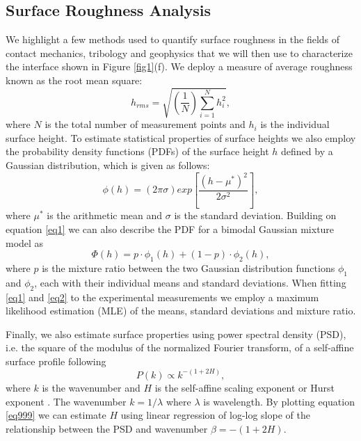 \documentclass[final,3p, 11pt,authoryear]{elsarticle}
\begin{document}
\subsection{Surface Roughness Analysis}
\label{SRA}
We highlight a few methods used to quantify surface roughness in the fields of contact mechanics, tribology and geophysics that we will then use to characterize the interface shown in Figure \ref{fig1}(f). We deploy a measure of average roughness known as the root mean square:
\begin{equation}
h_{rms} = \sqrt{\left(\frac{1}{N} \right) \sum^{N}_{i=1} h_{i}^{2}} ,
\label{eq99}
\end{equation}
\noindent where $N$ is the total number of measurement points and $h_{i}$ is the individual surface height. To estimate statistical properties of surface heights we also employ the probability density functions (PDFs) of the surface height $h$ defined by a Gaussian distribution, which is given as follows:
\begin{equation}
\phi(h) = \left( 2\pi \sigma \right) exp\left[ \frac{\left(h - \mu^{*}\right)^{2}} { 2\sigma^{2}}  \right],
\label{eq1}
\end{equation} 
\noindent where $\mu^{*}$ is the arithmetic mean and $\sigma$ is the standard deviation. Building on equation \eqref{eq1} we can also describe the PDF for a bimodal Gaussian mixture model as 
\begin{equation}
\Phi(h) = p\cdot \phi_{1}(h)+\left(1-p\right)\cdot \phi_{2}(h),
\label{eq2}
\end{equation}
\noindent where $p$ is the mixture ratio between the two Gaussian distribution functions $\phi_{1}$ and $\phi_{2}$, each with their individual means and standard deviations. When fitting \eqref{eq1} and \eqref{eq2} to the experimental measurements we employ a maximum likelihood estimation (MLE) of the means, standard deviations and mixture ratio. 

Finally, we also estimate surface properties using power spectral density (PSD), i.e.  the square of the modulus of the normalized Fourier transform, of a self-affine surface profile following 
\begin{equation}
P(k) \propto k^{-(1+2H)},
\label{eq999}
\end{equation}
\noindent where $k$ is the wavenumber and $H$ is the self-affine scaling exponent or Hurst exponent \citep{Power1991,Schmittbuhl1995, Candela2009}. The wavenumber $k = 1/\lambda$ where $\lambda$ is wavelength. By plotting equation \eqref{eq999} we can estimate $H$ using linear regression of log-log slope of the relationship between the PSD and wavenumber $\beta =-(1+2H)$.  
\end{document}
